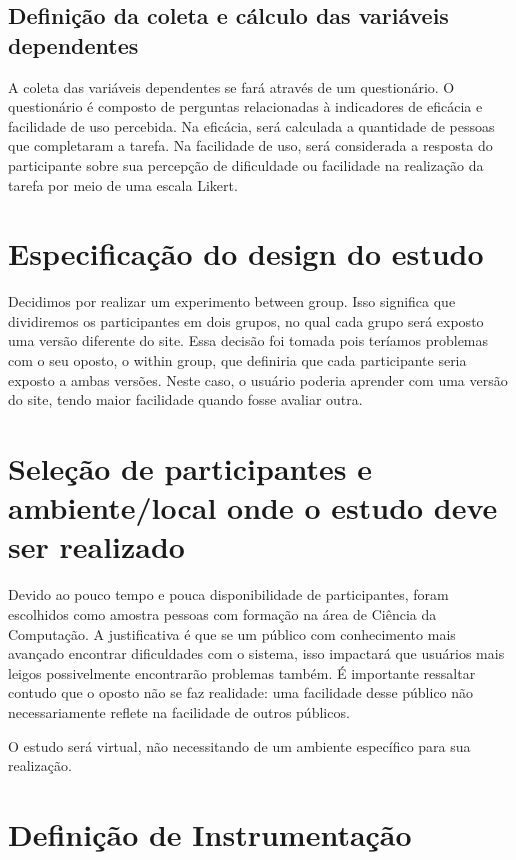 \documentclass[12pt]{article}
\begin{document}
\subsection{Definição da coleta e cálculo das variáveis dependentes}

A coleta das variáveis dependentes se fará através de um questionário. O questionário é composto de perguntas relacionadas à indicadores de eficácia e facilidade de uso percebida. Na eficácia, será calculada a quantidade de pessoas que completaram a tarefa. Na facilidade de uso, será considerada a resposta do participante sobre sua percepção de dificuldade ou facilidade na realização da tarefa por meio de uma escala Likert. 

\section{Especificação do design do estudo}

Decidimos por realizar um experimento between group. Isso significa que dividiremos os participantes em dois grupos, no qual cada grupo será exposto uma versão diferente do site. Essa decisão foi tomada pois teríamos problemas com o seu oposto, o within group,  que definiria que cada participante seria exposto a ambas versões. Neste caso, o usuário poderia aprender com uma versão do site, tendo maior facilidade quando fosse avaliar outra.

\section{Seleção de participantes e ambiente/local onde o estudo deve ser realizado}

Devido ao pouco tempo e pouca disponibilidade de participantes, foram escolhidos como amostra pessoas com formação na área de Ciência da Computação. A justificativa é que se um público com conhecimento mais avançado encontrar dificuldades com o sistema, isso impactará que usuários mais leigos possivelmente encontrarão problemas também. É importante ressaltar contudo que o oposto não se faz realidade: uma facilidade desse público não necessariamente reflete na facilidade de outros públicos.

O estudo será virtual, não necessitando de um ambiente específico para sua realização.

\section{Definição de Instrumentação}
\end{document}
